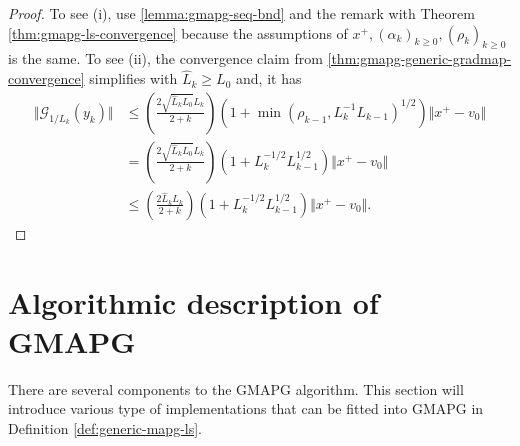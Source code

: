 \documentclass[12pt]{report}
\begin{document}
        \begin{proof}
            To see (i), use \ref{lemma:gmapg-seq-bnd} and the remark with Theorem \ref{thm:gmapg-ls-convergence} because the assumptions of $x^+, (\alpha_k)_{k \ge 0}, (\rho_k)_{k \ge 0}$ is the same. 
            To see (ii), the convergence claim from \ref{thm:gmapg-generic-gradmap-convergence} simplifies with $\hat L_k \ge L_0$ and, it has 
            \begin{align*}
                \Vert \mathcal G_{1/L_k}(y_k) \Vert
                &\le 
                \left(
                    \frac{2\sqrt{\hat L_kL_0}L_k}{2 + k}
                \right)\left(
                    1 + \min(\rho_{k - 1}, L_k^{-1}L_{k - 1})^{1/2}
                \right)\Vert x^+ - v_0\Vert
                \\
                &= 
                \left(
                    \frac{2\sqrt{\hat L_kL_0}L_k}{2 + k}
                \right)\left(
                    1 + L_k^{-1/2}L_{k - 1}^{1/2}
                \right)\Vert x^+ - v_0\Vert
                \\
                &\le 
                \left(
                    \frac{2\hat L_k L_k}{2 + k}
                \right)\left(
                    1 + L_k^{-1/2}L_{k - 1}^{1/2}
                \right)\Vert x^+ - v_0\Vert. 
            \end{align*}
        \end{proof}
    
    \section{Algorithmic description of GMAPG}
        There are several components to the GMAPG algorithm. 
        This section will introduce various type of implementations that can be fitted into GMAPG in Definition \ref{def:generic-mapg-ls}. 
\end{document}
